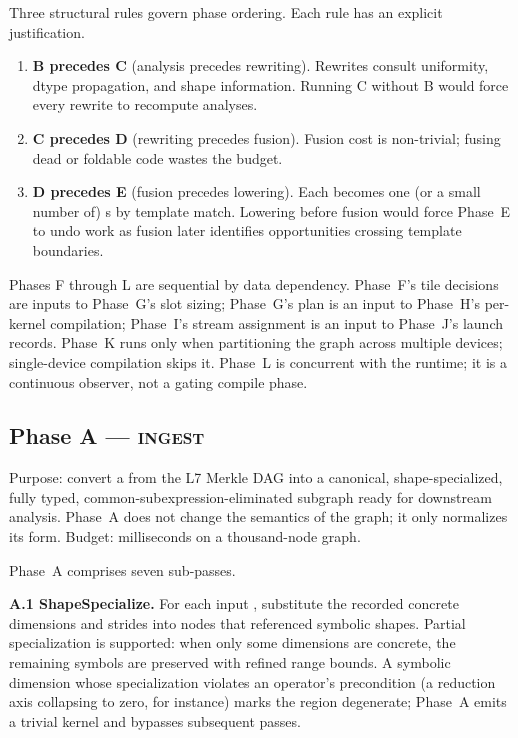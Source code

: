 Three structural rules govern phase ordering.
Each rule has an explicit justification.

\begin{enumerate}
  \item \textbf{B precedes C} (analysis precedes rewriting).
        Rewrites consult uniformity, dtype propagation, and shape information.
        Running C without B would force every rewrite to recompute analyses.
  \item \textbf{C precedes D} (rewriting precedes fusion).
        Fusion cost is non-trivial; fusing dead or foldable code wastes the budget.
  \item \textbf{D precedes E} (fusion precedes lowering).
        Each  becomes one (or a small number of) s by template match.
        Lowering before fusion would force Phase~E to undo work as fusion later identifies opportunities crossing template boundaries.
\end{enumerate}

Phases F through L are sequential by data dependency.
Phase~F's tile decisions are inputs to Phase~G's slot sizing; Phase~G's plan is an input to Phase~H's per-kernel compilation; Phase~I's stream assignment is an input to Phase~J's launch records.
Phase~K runs only when partitioning the graph across multiple devices; single-device compilation skips it.
Phase~L is concurrent with the runtime; it is a continuous observer, not a gating compile phase.

\subsection{Phase A --- \textsc{ingest}}
\label{sec:forge-phase-a}

Purpose: convert a  from the L7 Merkle DAG into a canonical, shape-specialized, fully typed, common-subexpression-eliminated  subgraph ready for downstream analysis.
Phase~A does not change the semantics of the graph; it only normalizes its form.
Budget:  milliseconds on a thousand-node graph.

Phase~A comprises seven sub-passes.

\textbf{A.1 ShapeSpecialize.}
For each input , substitute the recorded concrete dimensions and strides into  nodes that referenced symbolic shapes.
Partial specialization is supported: when only some dimensions are concrete, the remaining symbols are preserved with refined range bounds.
A symbolic dimension whose specialization violates an operator's precondition (a reduction axis collapsing to zero, for instance) marks the region degenerate; Phase~A emits a trivial kernel and bypasses subsequent passes.

